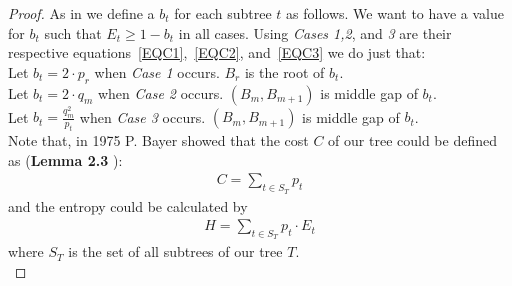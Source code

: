 \documentclass[letterpaper,12pt,titlepage,oneside,final]{book}
\theoremstyle{plain}
\begin{document}
\begin{proof}
As in \cite{bayer1975improved} we define a $b_t$ for each subtree $t$ as follows. We want to have a value for $b_t$ such that $E_t \geq 1 - b_t$ in all cases. Using \textit{Cases 1,2}, and \textit{3} are their respective equations~\ref{EQC1},~\ref{EQC2}, and~\ref{EQC3} we do just that: \\
Let $b_t=2\cdot p_r$ when \textit{Case 1} occurs. $B_r$ is the root of $b_t$. \\
Let $b_t=2\cdot q_m$ when \textit{Case 2} occurs. $(B_m, B_{m+1})$ is middle gap of $b_t$. \\
Let $b_t=\frac{q_m^2}{p_t}$ when \textit{Case 3} occurs. $(B_m, B_{m+1})$ is middle gap of $b_t$. \\


Note that, in 1975 P. Bayer showed that the cost $C$ of our tree could be defined as (\textbf{Lemma 2.3} \cite{bayer1975improved}): \\
\begin{align*}
C = \sum_{t \in S_T} p_t
\end{align*}
and the entropy could be calculated by
\begin{align*}
H = \sum_{t \in S_T} p_t \cdot E_t
\end{align*}  
where $S_T$ is the set of all subtrees of our tree $T$. \\


\end{proof}
\end{document}
